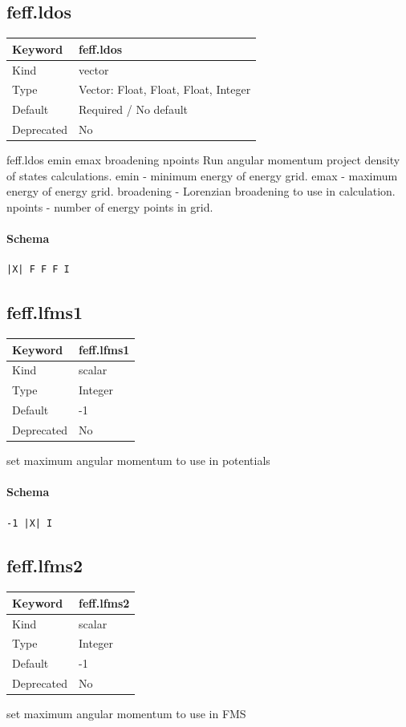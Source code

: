 \documentclass[11pt]{article}
\begin{document}
{{{{\subsection{feff.ldos}
\label{kw:feff-ldos}
\begin{longtable}{|p{1.5in}|p{4.5in}|}
\hline
Keyword & feff.ldos \\
\hline
Kind & vector \\
\hline
Type & Vector: Float, Float, Float, Integer \\
\hline
Default & Required / No default \\
\hline
Deprecated & No \\
\hline
\end{longtable}
 feff.ldos{ emin emax broadening npoints }
 Run angular momentum project density of states calculations.
 emin       - minimum energy of energy grid.
 emax       - maximum energy of energy grid.
 broadening - Lorenzian broadening to use in calculation.
 npoints    - number of energy points in grid.

\paragraph{Schema}
\begin{Verbatim}
|X| F F F I
\end{Verbatim}

\subsection{feff.lfms1}
\label{kw:feff-lfms1}
\begin{longtable}{|p{1.5in}|p{4.5in}|}
\hline
Keyword & feff.lfms1 \\
\hline
Kind & scalar \\
\hline
Type & Integer \\
\hline
Default & -1 \\
\hline
Deprecated & No \\
\hline
\end{longtable}
 set maximum angular momentum to use in potentials

\paragraph{Schema}
\begin{Verbatim}
-1 |X| I
\end{Verbatim}

\subsection{feff.lfms2}
\label{kw:feff-lfms2}
\begin{longtable}{|p{1.5in}|p{4.5in}|}
\hline
Keyword & feff.lfms2 \\
\hline
Kind & scalar \\
\hline
Type & Integer \\
\hline
Default & -1 \\
\hline
Deprecated & No \\
\hline
\end{longtable}
 set maximum angular momentum to use in FMS

}}}}
\end{document}
